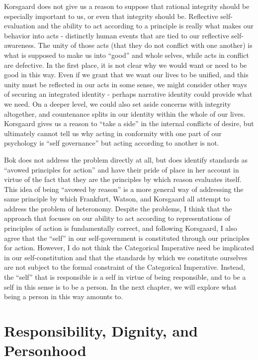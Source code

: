 \documentclass[phd,12pt,oneside,paper=letterpaper]{ubcthesis}
\begin{document}
Korsgaard does not give us a reason to suppose that rational integrity should be especially important to us, or even that integrity should be. Reflective self-evaluation and the ability to act according to a principle is really what makes our behavior into acts - distinctly human events that are tied to our reflective self-awareness. The unity of those acts (that they do not conflict with one another) is what is supposed to make us into ``good'' and whole selves, while acts in conflict are defective. In the first place, it is not clear why we would want or need to be good in this way. Even if we grant that we want our lives to be unified, and this unity must be reflected in our acts in some sense, we might consider other ways of securing an integrated identity - perhaps narrative identity \citep{schechtman1996} could provide what we need. On a deeper level, we could also set aside concerns with integrity altogether, and countenance splits in our identity within the whole of our lives. Korsgaard gives us a reason to ``take a side'' in the internal conflicts of desire, but ultimately cannot tell us why acting in conformity with one part of our psychology is ``self governance'' but acting according to another is not. 

Bok does not address the problem directly at all, but does identify standards as ``avowed principles for action'' \citep[p.129 fn4]{bok1998} and have their pride of place in her account in virtue of the fact that they are the principles by which reason evaluates itself. This idea of being ``avowed by reason'' is a more general way of addressing the same principle by which Frankfurt, Watson, and Korsgaard all attempt to address the problem of heteronomy. Despite the problems, I think that the approach that focuses on our ability to act according to representations of principles of action is fundamentally correct, and following Korsgaard, I also agree that the ``self'' in our self-government is constituted through our principles for action. However, I do not think the Categorical Imperative need be implicated in our self-constitution and that the standards by which we constitute ourselves are not subject to the formal constraint of the Categorical Imperative. Instead, the ``self'' that is responsible is a self in virtue of being responsible, and to be a self in this sense is to be a person. In the next chapter, we will explore what being a person in this way amounts to. 

\chapter{Responsibility, Dignity, and Personhood}
\end{document}
